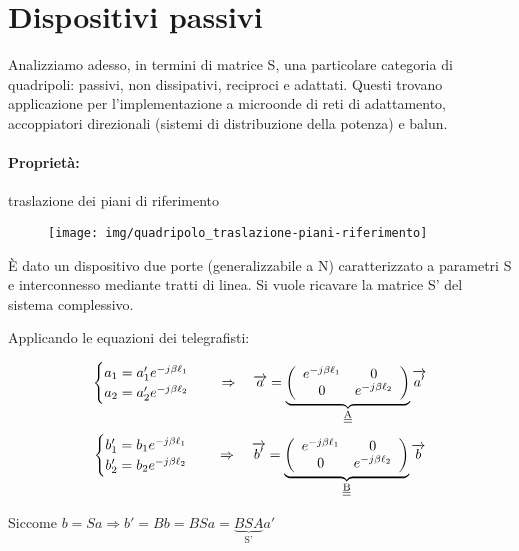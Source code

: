 \newpage
\section{Dispositivi passivi}
Analizziamo adesso, in termini di matrice S, una particolare categoria di quadripoli: passivi, non dissipativi, reciproci e adattati. Questi trovano applicazione per l'implementazione a microonde di reti di adattamento, accoppiatori direzionali (sistemi di distribuzione della potenza) e balun.

\paragraph{Proprietà:}  traslazione dei piani di riferimento

\begin{figure}[tbh]
	\centering
	\texttt{[image: img/quadripolo\_traslazione-piani-riferimento]}
	\caption{}
	\label{fig:quadripolotraslazione-piani-riferimento}
\end{figure}

È dato un dispositivo due porte (generalizzabile a N) caratterizzato a parametri S e interconnesso mediante tratti di linea. Si vuole ricavare la matrice S' del sistema complessivo.

Applicando le equazioni dei telegrafisti:

\[
\begin{cases}
a_1 = a_1' e^{-j\beta \ell_1}\\
a_2 = a_2' e^{-j\beta \ell_2}
\end{cases}
\quad
\Rightarrow
\quad
\overrightarrow{a} =
\underbrace{
	\left(
	\begin{array}{cc}
	e^{-j\beta \ell_1} & 0\\
	0 & e^{-j\beta \ell_2}
	\end{array}
	\right)
}_\text{\underline{\underline{A}}}
\overrightarrow{a'}
\]
\[
\begin{cases}
b_1' = b_1 e^{-j\beta \ell_1}\\
b_2' = b_2 e^{-j\beta \ell_2}
\end{cases}
\quad
\Rightarrow
\quad
\overrightarrow{b'} =
\underbrace{
	\left(
	\begin{array}{cc}
	e^{-j\beta \ell_1} & 0\\
	0 & e^{-j\beta \ell_2}
	\end{array}
	\right)
}_\text{\underline{\underline{B}}}
\overrightarrow{b}
\]

Siccome $b = Sa \Rightarrow b' = Bb = BSa = \underbrace{BSA}_\text{S'}a'$

